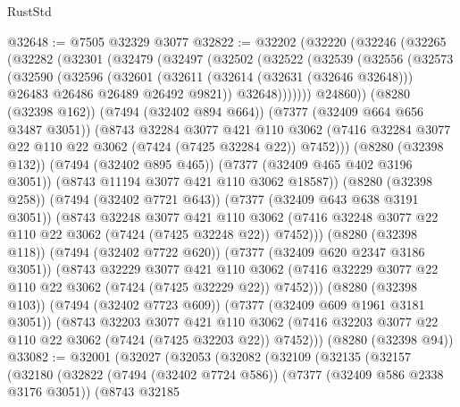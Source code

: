 \begin{lexlean}{RustStd}
\begin{coremodule}
@32648 := @7505 @32329 @3077
@32822 := @32202
    (@32220
      (@32246
        (@32265
          (@32282
            (@32301
              (@32479
                (@32497
                  (@32502
                    (@32522
                      (@32539
                        (@32556
                          (@32573
                            (@32590
                              (@32596
                                (@32601
                                  (@32611
                                    (@32614 (@32631 (@32646 @32648)))
                                    @26483
                                    @26486
                                    @26489
                                    @26492
                                    @9821))
                                @32648)))))))
                  @24860))
              (@8280 (@32398 @162))
              (@7494 (@32402 @894 @664))
              (@7377 (@32409 @664 @656 @3487 @3051))
              (@8743
                @32284
                @3077
                @421
                @110
                @3062
                (@7416 @32284 @3077 @22 @110 @22 @3062 (@7424 (@7425 @32284 @22)) @7452)))
            (@8280 (@32398 @132))
            (@7494 (@32402 @895 @465))
            (@7377 (@32409 @465 @402 @3196 @3051))
            (@8743 @11194 @3077 @421 @110 @3062 @18587))
          (@8280 (@32398 @258))
          (@7494 (@32402 @7721 @643))
          (@7377 (@32409 @643 @638 @3191 @3051))
          (@8743
            @32248
            @3077
            @421
            @110
            @3062
            (@7416 @32248 @3077 @22 @110 @22 @3062 (@7424 (@7425 @32248 @22)) @7452)))
        (@8280 (@32398 @118))
        (@7494 (@32402 @7722 @620))
        (@7377 (@32409 @620 @2347 @3186 @3051))
        (@8743
          @32229
          @3077
          @421
          @110
          @3062
          (@7416 @32229 @3077 @22 @110 @22 @3062 (@7424 (@7425 @32229 @22)) @7452)))
      (@8280 (@32398 @103))
      (@7494 (@32402 @7723 @609))
      (@7377 (@32409 @609 @1961 @3181 @3051))
      (@8743
        @32203
        @3077
        @421
        @110
        @3062
        (@7416 @32203 @3077 @22 @110 @22 @3062 (@7424 (@7425 @32203 @22)) @7452)))
    (@8280 (@32398 @94))
@33082 := @32001
    (@32027
      (@32053
        (@32082
          (@32109
            (@32135
              (@32157
                (@32180
                  (@32822
                    (@7494 (@32402 @7724 @586))
                    (@7377 (@32409 @586 @2338 @3176 @3051))
                    (@8743
                      @32185

\end{coremodule}
\end{lexlean}

